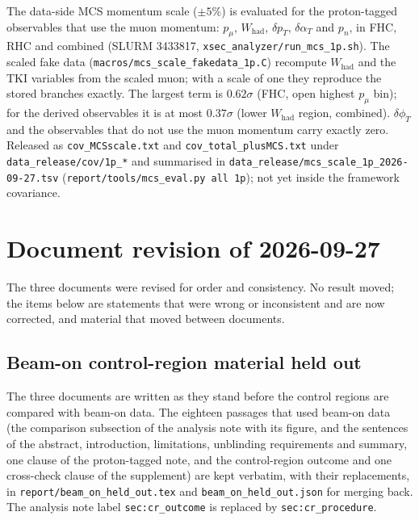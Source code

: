The data-side MCS momentum scale ($\pm5\%$) is evaluated for the proton-tagged observables that use
the muon momentum: $p_\mu$, $W_\mathrm{had}$, $\delta p_T$, $\delta\alpha_T$ and $p_n$, in FHC, RHC and
combined (SLURM 3433817, \texttt{xsec\_analyzer/run\_mcs\_1p.sh}). The scaled fake data
(\texttt{macros/mcs\_scale\_fakedata\_1p.C}) recompute $W_\mathrm{had}$ and the TKI variables from the
scaled muon; with a scale of one they reproduce the stored branches exactly. The largest term is
$0.62\sigma$ (FHC, open highest $p_\mu$ bin); for the derived observables it is at most $0.37\sigma$
(lower $W_\mathrm{had}$ region, combined). $\delta\phi_T$ and the observables that do not use the muon
momentum carry exactly zero. Released as \texttt{cov\_MCSscale.txt} and \texttt{cov\_total\_plusMCS.txt}
under \texttt{data\_release/cov/1p\_*} and summarised in \texttt{data\_release/mcs\_scale\_1p\_2026-09-27.tsv}
(\texttt{report/tools/mcs\_eval.py all 1p}); not yet inside the framework covariance.

\section{Document revision of 2026-09-27}

The three documents were revised for order and consistency. No result moved; the items below are
statements that were wrong or inconsistent and are now corrected, and material that moved between
documents.

\subsection{Beam-on control-region material held out}
The three documents are written as they stand before the control regions are compared with beam-on
data. The eighteen passages that used beam-on data (the comparison subsection of the analysis note
with its figure, and the sentences of the abstract, introduction, limitations, unblinding
requirements and summary, one clause of the proton-tagged note, and the control-region outcome and
one cross-check clause of the supplement) are kept verbatim, with their replacements, in
\texttt{report/beam\_on\_held\_out.tex} and \texttt{beam\_on\_held\_out.json} for merging back.
The analysis note label \texttt{sec:cr\_outcome} is replaced by \texttt{sec:cr\_procedure}.


